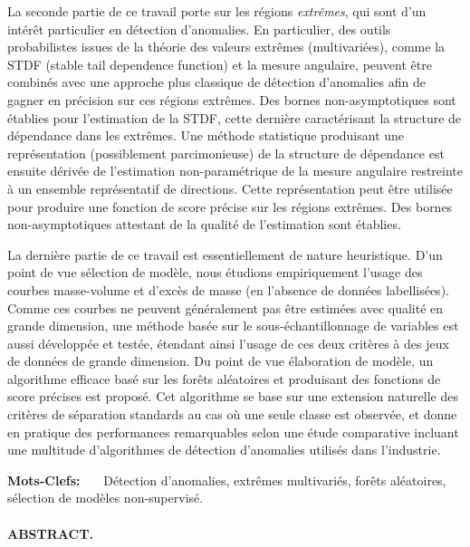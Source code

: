\documentclass[a4paper, 8pt]{article}
\begin{document}
La seconde partie de ce travail porte sur les régions \emph{extrêmes}, qui sont d'un intérêt particulier en détection d'anomalies. En particulier, des outils probabilistes issues de la théorie des valeurs extrêmes (multivariées), comme la STDF (stable tail dependence function) et la mesure angulaire, peuvent être combinés avec une approche plus classique de détection d'anomalies afin de gagner en précision sur ces régions extrêmes.
Des bornes non-asymptotiques sont établies pour l'estimation de la STDF, cette dernière caractérisant la structure de dépendance dans les extrêmes.
%
Une méthode statistique produisant une représentation (possiblement parcimonieuse) de la structure de dépendance est ensuite dérivée de l'estimation non-paramétrique de la mesure angulaire restreinte à un ensemble représentatif de directions. Cette représentation peut être utilisée pour produire une fonction de score précise sur les régions extrêmes. Des bornes non-asymptotiques attestant de la qualité de l'estimation sont établies.
%

La dernière partie de ce travail est essentiellement de nature heuristique. D'un point de vue sélection de modèle, nous étudions empiriquement l'usage des courbes masse-volume et d'excès de masse (en l'absence de données labellisées). Comme ces courbes ne peuvent généralement pas être estimées avec qualité en grande dimension, une méthode basée sur le sous-échantillonnage de variables est aussi développée et testée, étendant ainsi l'usage de ces deux critères à des jeux de données de grande dimension.
%
Du point de vue élaboration de modèle, un algorithme efficace basé sur les forêts aléatoires et produisant des fonctions de score précises est proposé. Cet algorithme se base sur une extension naturelle des critères de séparation standards au cas où une seule classe est observée, et donne en pratique des performances remarquables selon une étude comparative incluant une multitude d'algorithmes de détection d'anomalies utilisés dans l'industrie.
\vspace{0.5em}

\textbf{Mots-Clefs:} ~~~Détection d'anomalies, extrêmes multivariés, forêts aléatoires, sélection de modèles non-supervisé.

\vspace{0.7em}

\paragraph{ABSTRACT.}
\end{document}
